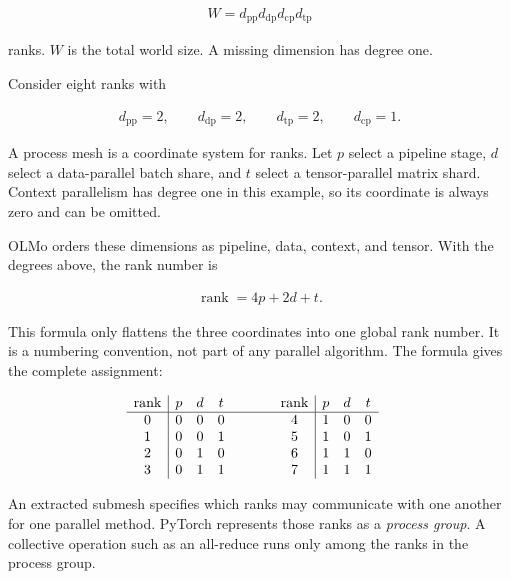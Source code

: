 \documentclass[11pt]{article}
\begin{document}
\begin{equation}
\begin{split}
W=d_{\mathrm{pp}}d_{\mathrm{dp}}d_{\mathrm{cp}}d_{\mathrm{tp}}
\end{split}
\end{equation}

ranks. \(W\) is the total world size. A missing dimension has degree one.

Consider eight ranks with

\begin{equation}
\begin{split}
d_{\mathrm{pp}}=2,\qquad d_{\mathrm{dp}}=2,\qquad
d_{\mathrm{tp}}=2,\qquad d_{\mathrm{cp}}=1.
\end{split}
\end{equation}

A process mesh is a coordinate system for ranks.  Let \(p\) select a pipeline
stage, \(d\) select a data-parallel batch share, and \(t\) select a
tensor-parallel matrix shard.  Context parallelism has degree one in this
example, so its coordinate is always zero and can be omitted.

OLMo orders these dimensions as pipeline, data, context, and tensor.  With the
degrees above, the rank number is

\begin{equation}
\begin{split}
\operatorname{rank}=4p+2d+t.
\end{split}
\end{equation}

This formula only flattens the three coordinates into one global rank number.
It is a numbering convention, not part of any parallel algorithm.  The formula
gives the complete assignment:

\begin{equation}
\begin{split}
&\begin{array}{c|ccc@{\qquad\qquad}c|ccc}
\text{rank} & p & d & t & \text{rank} & p & d & t\\ \hline
0 & 0 & 0 & 0 & 4 & 1 & 0 & 0\\
1 & 0 & 0 & 1 & 5 & 1 & 0 & 1\\
2 & 0 & 1 & 0 & 6 & 1 & 1 & 0\\
3 & 0 & 1 & 1 & 7 & 1 & 1 & 1
\end{array}
\end{split}
\end{equation}

An extracted submesh specifies which ranks may communicate with one another
for one parallel method.  PyTorch represents those ranks as a \emph{process
group}.  A collective operation such as an all-reduce runs only among the
ranks in the process group.
\end{document}
